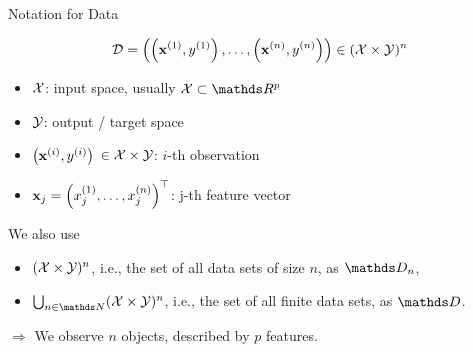 \documentclass[11pt,compress,t,notes=noshow, xcolor=table]{beamer}
\begin{document}
\begin{vbframe}{Notation for Data}

\[
\mathcal{D} = \left( \left(\mathbf{x}^{(1)}, y^{(1)}\right), \ldots, \left(\mathbf{x}^{(n)}, y^{(n)}\right)\right) \in (\mathcal{X} \times \mathcal{Y})^n
\]


\begin{itemize}

  \item $\mathcal{X}$: input space, usually $\Xspace \subset \R^p$
  
  \item $\mathcal{Y}$: output / target space
  
  \item \(\left(\mathbf{x}^{(i)}, y^{(i)}\right)\) $\in \mathcal{X}\times \mathcal{Y}$:  \(i\)-th observation
  
  \item $\mathbf{x}_j = \left(x^{(1)}_j, \ldots, x^{(n)}_j\right)^\top$: j-th feature vector
  
\end{itemize}

We also use

\begin{itemize}

  \item  $(\mathcal{X} \times \mathcal{Y})^n$, i.e., the set of all data sets of size $n$, as $\allDatasetsn$,
  \item $\defAllDatasets$, i.e., the set of all finite data sets, as $\allDatasets$.
\end{itemize}

\lz

$\Rightarrow$ We observe $n$ objects, described by $p$ features.

\end{vbframe}

\end{document}
